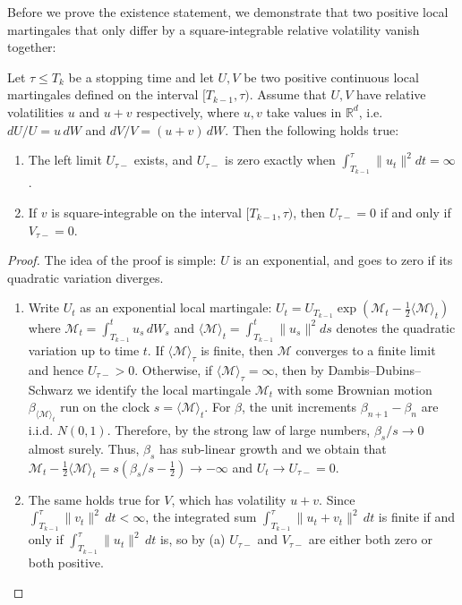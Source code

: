 \documentclass[smallextended,envcountsame,envcountsect]{svjour3}
\newcommand{\R}{\mathbb R}
\begin{document}
Before we prove the existence statement, we demonstrate that two positive local martingales that only differ by a square-integrable relative volatility vanish together: 
\begin{lemma}
\label{lem:zero_sets_bh}  
Let $\tau\le T_k$ be a stopping time and let $U, V$ be two positive continuous local martingales defined on the interval $[T_{k-1},\tau)$. Assume that $U, V$ have relative volatilities $u$ and $u + v$ respectively, where $u, v$ take values in $\R^d$, i.e. $dU / U = u \,dW$ and $dV / V = (u+v) \, dW$. Then the following holds true: 
\begin{enumerate}[label=(\alph*)]
  \item The left limit $U_{\tau-}$ exists, and $U_{\tau-}$ is zero exactly when $\int_{T_{k-1}}^{\tau} \| u_t \|^2 dt = \infty $.
  \item If $v$ is square-integrable on the interval $[T_{k-1}, \tau)$, then $U_{\tau-}=0$ if and only if $V_{\tau-}=0$.
\end{enumerate}
\end{lemma}
\begin{proof}
  The idea of the proof is simple: $U$ is an exponential, and goes to zero if its quadratic variation diverges. 
  \begin{enumerate}[label=(\alph*)]
    \item Write $U_t$ as an exponential local martingale: $U_t = U_{T_{k-1}}\exp(\mathcal{M}_t - \frac{1}{2}\langle \mathcal{M} \rangle_t)$ where $\mathcal{M}_t = \int_{T_{k-1}}^t u_s \, dW_s$ and $\langle \mathcal{M} \rangle_t = \int_{T_{k-1}}^t\|u_s\|^2ds$ denotes the quadratic variation up to time $t$. If $\langle \mathcal{M} \rangle_\tau$ is finite, then $\mathcal{M}$ converges to a finite limit and hence $U_{\tau-}>0$. Otherwise, if $\langle \mathcal{M} \rangle_\tau=\infty$, then by Dambis--Dubins--Schwarz we identify the local martingale $\mathcal{M}_t$ with some Brownian motion $ \beta_{\langle \mathcal{M} \rangle_t} $ run on the clock $s = \langle \mathcal{M} \rangle_t$. For $\beta$, the unit increments $\beta_{n+1} - \beta_{n}$ are i.i.d. $N(0,1)$. Therefore, by the strong law of large numbers, $\beta_s / s \to 0$ almost surely. Thus, $\beta_s$ has sub-linear growth and we obtain that $\mathcal{M}_t - \frac{1}{2}\langle \mathcal{M}\rangle_t = s( \beta_s/s - \frac{1}{2}) \to -\infty $ and $U_t \to U_{\tau-} = 0$.
    \item The same holds true for $V$, which has volatility $u+v$. Since $\int_{T_{k-1}}^\tau\|v_t\|^2 \, dt<\infty$, the integrated sum $\int_{T_{k-1}}^\tau\|u_t+v_t\|^2 \, dt$ is finite if and only if $\int_{T_{k-1}}^\tau\|u_t\|^2 \, dt$ is, so by (a) $U_{\tau-}$ and $V_{\tau-}$ are either both zero or both positive.
  \end{enumerate}
\end{proof}
\end{document}

